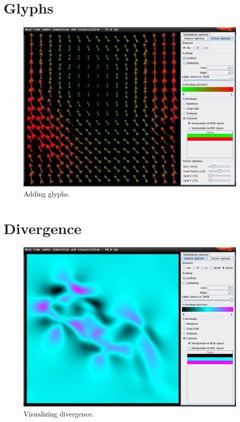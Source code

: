 \documentclass[a4paper,11pt,twoside]{report}
\begin{document}
	\section{Glyphs}
		\begin{figure}[h]
		\centering
		\includegraphics[scale=\imagescalefactor]{images/step3.png}
		\caption{Adding glyphs.}\label{fig:step3}
		\end{figure}
		\newpage
	\section{Divergence}
		\begin{figure}[h]
		\centering
		\includegraphics[scale=\imagescalefactor]{images/step4.png}
		\caption{Visualizing divergence.}\label{fig:step4}
		\end{figure}
		\newpage
\end{document}
